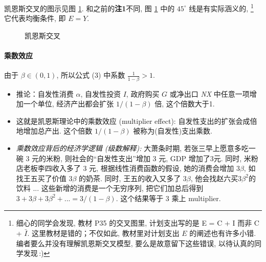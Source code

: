 凯恩斯交叉的图示见图 \ref{fig:cross}. 和之前的\textbf{注1}不同,
图 \ref{fig:cross} 中的 $45^\circ$ 线是有实际涵义的,%
   \footnote{细心的同学会发现, 教材 P35 的交叉图里, 计划支出写的是 E = C + I 而非 C + $\bar{I}$. 这里教材是错的；不仅如此, 教材里对计划支出 $E$ 的阐述也有许多小错. 编者要么并没有理解凯恩斯交叉模型, 要么是故意留下这些错误, 以待认真的同学发现$\,$:)}
它代表均衡条件, 即 $E=Y$.

\begin{figure}[H]
\centering
{}
\caption{凯恩斯交叉}
\label{fig:cross}
\end{figure}

\paragraph{乘数效应}   由于 $\beta \in  (0, 1)$,  所以公式  (3) 中系数 $\frac{1}{1-\beta} > 1$.
\begin{itemize}
  \item
    推论：自发性消费 $\alpha$,  自发性投资 $I$,  政府购买 $G$ 或净出口 \textit{NX}
    中任意一项增加一个单位, 经济产出都会扩张 $1/ (1-\beta)$ 倍, 这个倍数大于1. 
  \item
    这就是凯恩斯理论中的乘数效应  (multiplier effect):
    自发性支出的扩张会成倍地增加总产出. 这个倍数 $1/ (1-\beta)$
    被称为(自发性)支出乘数.

  \item
    \textit{乘数效应背后的经济学逻辑 (级数解释):} 大萧条时期, 若张三早上愿意多吃一碗 3
    元的米粉, 则社会的``自发性支出''增加 3 元, GDP
    增加了3元. 同时, 米粉店老板李四收入多了 3
    元, 根据线性消费函数的假设, 她的消费会增加 $3\beta$, 
    如找王五买了价值 $3 \beta$ 的奶茶. 同时, 王五的收入又多了
    $3 \beta$, 他会找赵六买$3 \beta^2$的饮料 ...
    这些新增的消费是一个无穷序列, 把它们加总后得到 $3 + 3 \beta + 3 \beta^2 + ... = 3/ (1-\beta)$.
    这个结果等于 3 乘上 multiplier.
  \end{itemize}

